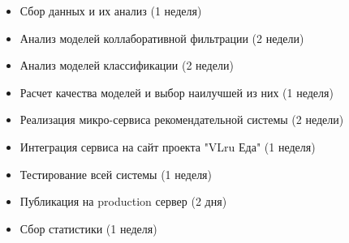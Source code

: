 \begin{itemize}
  \item Сбор данных и их анализ (1 неделя)
  \item Анализ моделей коллаборативной фильтрации (2 недели)
  \item Анализ моделей классификации (2 недели)
  \item Расчет качества моделей и выбор наилучшей из них (1 неделя)
  \item Реализация микро-сервиса рекомендательной системы (2 недели)
  \item Интеграция сервиса на сайт проекта "VLru Еда" (1 неделя)
  \item Тестирование всей системы (1 неделя)
  \item Публикация на production сервер (2 дня)
  \item Сбор статистики (1 неделя)
\end{itemize}
